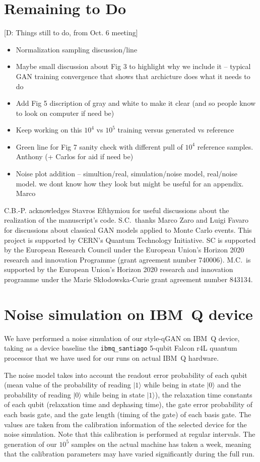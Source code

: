 \documentclass[twocolumn,preprintnumbers,superscriptaddress]{revtex4-2}
\newcommand{\commentDMG}[1]{{\color{orange} {[D: #1]}}}
\begin{document}
\section{Remaining to Do}
\commentDMG{Things still to do, from Oct. 6 meeting}
\begin{itemize}
\item Normalization sampling discussion/line
\item Maybe small discussion about Fig 3 to highlight why we include it -- typical GAN training convergence that shows that archicture does what it needs to do
\item Add Fig 5 discription of gray and white to make it clear (and so people know to look on computer if need be)
\item Keep working on this $10^4$ vs $10^5$ training versus generated vs reference
\item Green line for Fig 7 sanity check with different pull of $10^4$ reference samples. Anthony (+ Carlos for aid if need be)
\item Noise plot addition -- simultion/real, simulation/noise model, real/noise model. we dont know how they look but might be useful for an appendix. Marco
\end{itemize}

\acknowledgments

C.B.-P. acknowledges Stavros Efthymiou for useful discussions about the
realization of the manuscript's code. S.C.~thanks Marco Zaro and Luigi Favaro for
discussions about classical GAN models applied to Monte Carlo events. This
project is supported by CERN's Quantum Technology Initiative. SC is supported by the European Research
Council under the European Union's Horizon 2020 research and innovation
Programme (grant agreement number 740006).
M.C.\ is supported by the European Union’s Horizon 2020 research and innovation programme under the Marie Skłodowska-Curie grant agreement number 843134.


\appendix

\section{Noise simulation on IBM~Q device}

We have performed a noise simulation of our style-qGAN on IBM~Q device, taking as a device baseline the {\tt ibmq\_santiago}
5-qubit Falcon r4L quantum processor that we have used for our runs on actual IBM~Q hardware.

The noise model takes into account the readout error probability of each qubit (mean value of the probability
of reading $|1\rangle$ while being in state $|0\rangle$ and the probability of reading $|0\rangle$ while being in
state $|1\rangle$), the relaxation time constants of each qubit (relaxation time and dephasing time), the gate error probability
of each basis gate, and the gate length (timing of the gate) of each basis gate. The values are taken from the calibration information
of the selected device for the noise simulation. Note that this calibration is performed at regular intervals. The generation of our
$10^5$ samples on the actual machine has taken a week, meaning that the calibration parameters may have varied significantly
during the full run.
\end{document}

